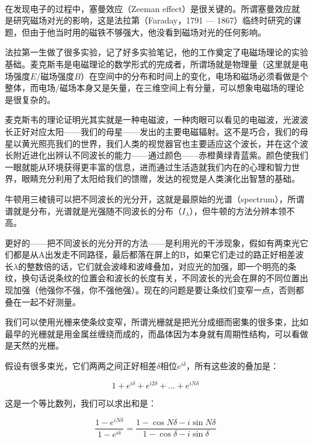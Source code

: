 ~

在发现电子的过程中，塞曼效应（Zeeman effect）是很关键的。所谓塞曼效应就是研究磁场对光的影响，这是法拉第（Faraday，1791 — 1867）临终时研究的课题，但由于他当时用的磁铁不够强大，他没看到磁场对光的任何影响。

法拉第一生做了很多实验，记了好多实验笔记，他的工作奠定了电磁场理论的实验基础。麦克斯韦是电磁理论的数学形式的完成者，所谓场就是物理量（这里就是电场强度$E$/磁场强度$B$）在空间中的分布和时间上的变化，电场和磁场必须看做是个整体，而电场/磁场本身又是矢量，在三维空间上有分量，可以想象电磁场的理论是很复杂的。

麦克斯韦的理论证明光其实就是一种电磁波，一种肉眼可以看见的电磁波，光波波长正好对应太阳——我们的母星——发出的主要电磁辐射。这不是巧合，我们的母星以黄光照亮我们的世界，我们人类的视觉器官也主要适应这个波长，并在这个波长附近进化出辨认不同波长的能力——通过颜色——赤橙黄绿青蓝紫。颜色使我们一眼就能从环境获得更丰富的信息，进而通过生活造就我们内在的心理和智力世界，眼睛充分利用了太阳给我们的馈赠，发达的视觉是人类演化出智慧的基础。

牛顿用三棱镜可以把不同波长的光分开，这就是最原始的光谱（spectrum），所谓谱就是分布，光谱就是光强随不同波长的分布（$I_{\lambda}$），但牛顿的方法分辨本领不高。

更好的——把不同波长的光分开的方法——是利用光的干涉现象，假如有两束光它们都是从A出发走不同路径，最后都落在屏上的B，如果它们走过的路正好相差波长$\lambda$的整数倍的话，它们就会波峰和波峰叠加，对应光的加强，即一个明亮的条纹，换句话说条纹的位置会和波长的长度有关，不同波长的光会在屏的不同位置出现加强（他强你不强，你不强他强）。现在的问题是要让条纹们变窄一点，否则都叠在一起不好测量。

我们可以使用光栅来使条纹变窄，所谓光栅就是把光分成细而密集的很多束，比如最早的光栅就是用金属丝缠绕而成的，而晶体因为本身就有周期性结构，可以看做是天然的光栅。

假设有很多束光，它们两两之间正好相差$\delta$相位$e^{i \delta}$，所有这些波的叠加是：

\begin{equation}
1 + e^{i \delta} + e^{i 2 \delta } + ... + e^{i N \delta}~
\end{equation}

这是一个等比数列，我们可以求出和是：

\begin{equation}
\frac{1 - e^{i N \delta}}{ 1 - e^{i \delta}} = \frac{ 1- \cos N \delta - i \sin N \delta }{ 1- \cos \delta - i \sin \delta}~
\end{equation}

